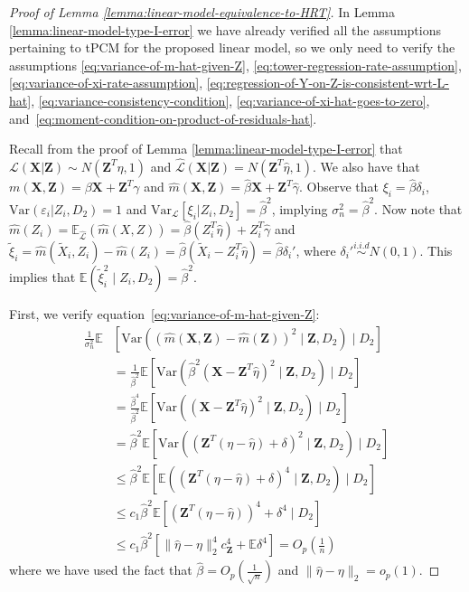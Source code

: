 \documentclass[12pt]{article}
\theoremstyle{definition}
\theoremstyle{remark}
\newcommand{\E}{\mathbb E}								%
\newcommand{\V}{\mathrm{Var}}							%
\newcommand{\prx}{\bm X}								%
\newcommand{\srx}{X}									%
\newcommand{\prz}{\bm Z}								%
\newcommand{\srz}{Z}									%
\newcommand{\law}{\mathcal L}							%
\newcommand{\lawhat}{\widehat{\mathcal L}}				%
\begin{document}
\begin{proof}[Proof of Lemma \ref{lemma:linear-model-equivalence-to-HRT}]
	In Lemma \ref{lemma:linear-model-type-I-error} we have already verified all the assumptions pertaining to tPCM for the proposed linear model, so we only need to verify the assumptions \eqref{eq:variance-of-m-hat-given-Z}, \eqref{eq:tower-regression-rate-assumption}, \eqref{eq:variance-of-xi-rate-assumption}, \eqref{eq:regression-of-Y-on-Z-is-consistent-wrt-L-hat}, \eqref{eq:variance-consistency-condition}, \eqref{eq:variance-of-xi-hat-goes-to-zero}, and~\eqref{eq:moment-condition-on-product-of-residuals-hat}.
	
	Recall from the proof of Lemma \ref{lemma:linear-model-type-I-error} that $\law(\prx|\prz) \sim N(\prz^T\eta,1)  $ and $ \lawhat(\prx|\prz) = N(\prz^T \hat \eta, 1)$. We also have that $m(\prx,\prz) = \beta \prx + \prz^T \gamma$ and $\widehat m(\prx,\prz) = \hat \beta \prx + \prz^T\hat \gamma$. Observe that $\xi_i = \hat \beta \delta_i $, $\mathrm{Var}(\varepsilon_i | \srz_i, D_2) = 1$ and  $\mathrm{Var}_\law[\xi_i | \srz_i, D_2] = \hat{\beta}^2$, implying $\sigma_n^2 = \hat{\beta}^2$. Now note that $\widehat m(\srz_i) = \E_{\lawhat}(\widehat m(X,Z)) = \widehat \beta(\srz_i^T \widehat \eta) + \srz_i^T\widehat \gamma$ and $\widetilde \xi_i = \widehat m(\widetilde \srx_i,\srz_i) - \widehat m(\srz_i) = \widehat \beta(\widetilde \srx_i - \srz_i^T\widehat \eta) = \widehat \beta \delta_i'$, where $\delta_i' \overset{i.i.d}{\sim} N(0,1)$. This implies that $\E(\widetilde \xi_i^2 \mid \srz_i,D_2) = \widehat\beta^2$.
  
	First, we verify equation~\eqref{eq:variance-of-m-hat-given-Z}:
\begin{align*}
	\frac{1}{\sigma_n^2} \E&\left[ \V\left( \left(\widehat m(\prx,\prz) - \widehat m(\prz)\right)^2 \mid \prz, D_2\right)\mid D_2\right] \\ &= \frac{1}{\widehat \beta^2} \E\left[ \V\left( \widehat \beta^2\left(\prx - \prz^T\widehat \eta\right)^2 \mid \prz, D_2\right)\mid D_2\right]\\
	&= \frac{\widehat \beta^4}{\widehat \beta^2}  \E\left[ \V\left( \left(\prx - \prz^T\widehat \eta\right)^2 \mid \prz, D_2\right)\mid D_2\right]\\
	&= \widehat{\beta}^2  \E\left[ \V\left(  \left(\prz^T(\eta -\widehat \eta) + \delta\right)^2 \mid \prz, D_2\right)\mid D_2\right]\\
	&\leq \widehat{\beta}^2  \E\left[ \E\left( \left(\prz^T(\eta -\widehat \eta) + \delta\right)^4 \mid \prz, D_2\right)\mid D_2\right]\\
	&\leq c_1 \widehat{\beta}^2  \E\left[ \left(\prz^T(\eta -\widehat \eta) \right)^4+ \delta^4 \mid D_2\right]\\
	&\leq c_1 \widehat{\beta}^2 \left[ \|\widehat{\eta}-\eta\|_2^4c_{\prz}^4 + \E \delta^4\right] = O_p\left(\frac{1}{n}\right)
\end{align*}
where we have used the fact that $\widehat{\beta} =O_p\left(\frac{1}{\sqrt n}\right)$ and $\|\widehat{\eta}-\eta\|_2 = o_p(1)$. 


\end{proof}
\end{document}
